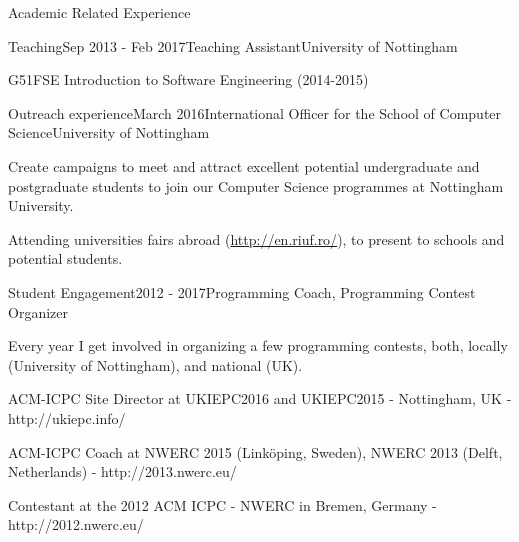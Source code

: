 \documentclass{resume} %
\begin{document}
\begin{rSection}{Academic Related Experience}
\begin{rSubsection}{Teaching}{Sep 2013 - Feb 2017}{Teaching Assistant}{University of Nottingham}
        \item G51FSE Introduction to Software Engineering (2014-2015)
    \end{rSubsection}
\vspace{-1 mm}
    \begin{rSubsection}{Outreach experience}{March 2016}{International Officer for the School of Computer Science}{University of Nottingham}
        \item Create campaigns to meet and attract excellent potential undergraduate and postgraduate students to join our Computer Science programmes at Nottingham University.
        \item Attending universities fairs abroad (\url{http://en.riuf.ro/}), to present to schools and potential students.
    \end{rSubsection}
\vspace{-1mm}
    \begin{rSubsection}{Student Engagement}{2012 - 2017}{Programming Coach, Programming Contest Organizer}{}
    	\item Every year I get involved in organizing a few programming contests, both, locally (University of Nottingham), and national (UK).
    	\item  ACM-ICPC Site Director at UKIEPC2016 and UKIEPC2015 - Nottingham, UK - {http://ukiepc.info/}
    	\item  ACM-ICPC Coach at NWERC 2015 (Linköping, Sweden), NWERC 2013 (Delft, Netherlands) - {http://2013.nwerc.eu/} 
    	\item Contestant at the 2012 ACM ICPC - NWERC in Bremen, Germany - {http://2012.nwerc.eu/}
    \end{rSubsection}
\end{rSection}
\vspace{-2 mm}
\end{document}
